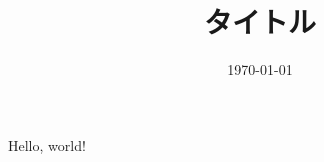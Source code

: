 \documentclass[a4j]{jsarticle}
\title{タイトル}
\author{}
\date{\today}
\begin{document}
\maketitle
Hello, world!
\end{document}

